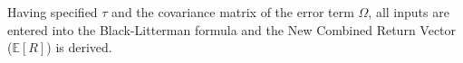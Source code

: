 Having specified $\tau$ and the covariance matrix of the error term $\Omega$, all inputs are entered into the Black-Litterman formula and the New Combined Return Vector ($\mathbb{E}[R]$) is derived. 



    


